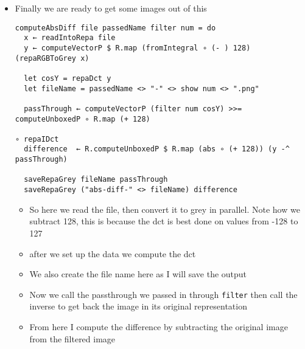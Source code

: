 \documentclass{article}
\begin{document}
\begin{enumerate}
\begin{itemize}
\item Finally we are ready to get some images out of this
\begin{verbatim}
computeAbsDiff file passedName filter num = do
  x ← readIntoRepa file
  y ← computeVectorP $ R.map (fromIntegral ∘ (- ) 128) (repaRGBToGrey x)

  let cosY = repaDct y
  let fileName = passedName <> "-" <> show num <> ".png"

  passThrough ← computeVectorP (filter num cosY) >>= computeUnboxedP ∘ R.map (+ 128)
                                                                      ∘ repaIDct
  difference  ← R.computeUnboxedP $ R.map (abs ∘ (+ 128)) (y -^ passThrough)

  saveRepaGrey fileName passThrough
  saveRepaGrey ("abs-diff-" <> fileName) difference
\end{verbatim}
\begin{itemize}
\item So here we read the file, then convert it to grey in
parallel. Note how we subtract 128, this is because the dct is
best done on values from -128 to 127

\item after we set up the data we compute the dct

\item We also create the file name here as Ι will save the output

\item Now we call the passthrough we passed in through \texttt{filter} then
call the inverse to get back the image in its original representation

\item From here I compute the difference by subtracting the original
image from the filtered image


\end{itemize}
\end{itemize}
\end{enumerate}
\end{document}
